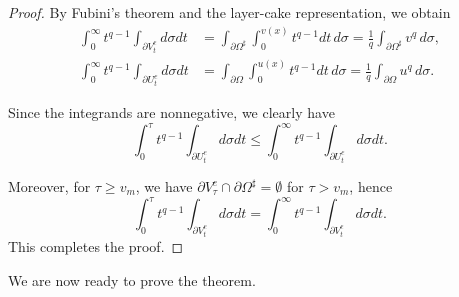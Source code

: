 \documentclass[11pt]{article}
\numberwithin{equation}{section}
\theoremstyle{definition}
\theoremstyle{remark}
\begin{document}
\begin{proof}
By Fubini's theorem and the layer-cake representation, we obtain
\begin{align*}
\int_0^{\infty}t^{q-1}\int_{\partial V_t^e} d\sigma dt
&=
\int_{\partial\Omega^\sharp}\int_0^{v(x)} t^{q-1}dt\, d\sigma
=
\frac{1}{q}\int_{\partial\Omega^\sharp} v^{q}\, d\sigma,
\\
\int_0^{\infty}t^{q-1}\int_{\partial U_t^e} d\sigma dt
&=
\int_{\partial\Omega}\int_0^{u(x)}t^{q-1} dt\, d\sigma
=
\frac{1}{q}\int_{\partial\Omega} u^q\, d\sigma.
\end{align*}

Since the integrands are nonnegative, we clearly have
\[
\int_0^{\tau}t^{q-1}\int_{\partial U_t^e} d\sigma dt
\le
\int_0^{\infty}t^{q-1}\int_{\partial U_t^e} d\sigma dt.
\]

Moreover, for $\tau\ge v_m$, we have $\partial V_\tau^e \cap \partial \Omega^\sharp=\emptyset$ for $\tau>v_m$, hence
\[
\int_0^{\tau}t^{q-1}\int_{\partial V_t^e} d\sigma dt
=
\int_0^{\infty}t^{q-1}\int_{\partial V_t^e} d\sigma dt.
\]
This completes the proof.

\end{proof}
We are now ready to prove the theorem.
\end{document}
